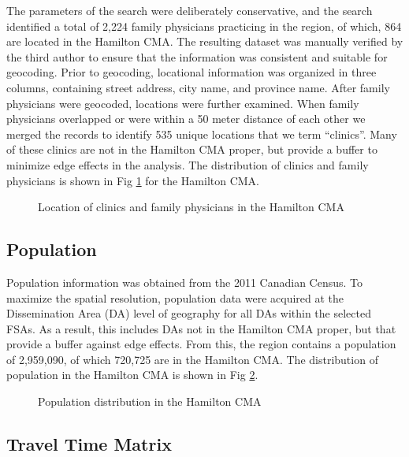 \documentclass[10pt,letterpaper]{article}
\begin{document}
The parameters of the search were deliberately conservative, and the
search identified a total of 2,224 family physicians practicing in the
region, of which, 864 are located in the Hamilton CMA. The resulting
dataset was manually verified by the third author to ensure that the
information was consistent and suitable for geocoding. Prior to
geocoding, locational information was organized in three columns,
containing street address, city name, and province name. After family
physicians were geocoded, locations were further examined. When family
physicians overlapped or were within a 50 meter distance of each other
we merged the records to identify 535 unique locations that we term
``clinics''. Many of these clinics are not in the Hamilton CMA proper,
but provide a buffer to minimize edge effects in the analysis. The
distribution of clinics and family physicians is shown in Fig
\ref{fig:fig3-clinic-map} for the Hamilton CMA.

\begin{figure}[htbp]
\centering
\caption{\label{fig:fig3-clinic-map}Location of clinics and family
physicians in the Hamilton CMA}
\end{figure}

\subsection{Population}\label{population}

Population information was obtained from the 2011 Canadian Census. To
maximize the spatial resolution, population data were acquired at the
Dissemination Area (DA) level of geography for all DAs within the
selected FSAs. As a result, this includes DAs not in the Hamilton CMA
proper, but that provide a buffer against edge effects. From this, the
region contains a population of 2,959,090, of which 720,725 are in the
Hamilton CMA. The distribution of population in the Hamilton CMA is
shown in Fig \ref{fig:fig4-population-map}.

\begin{figure}[htbp]
\centering
\caption{\label{fig:fig4-population-map}Population distribution in the
Hamilton CMA}
\end{figure}

\subsection{Travel Time Matrix}\label{travel-time-matrix}
\end{document}
